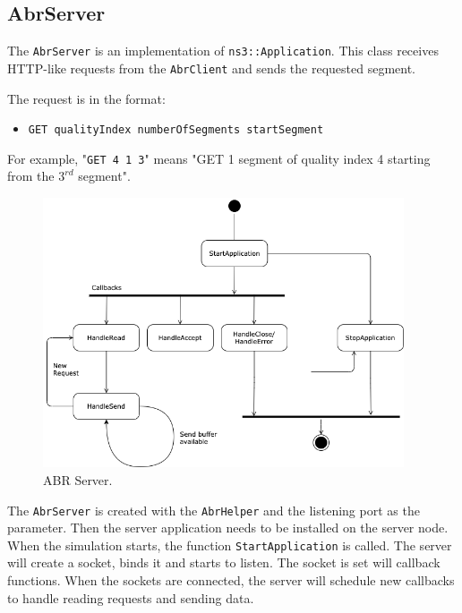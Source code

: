 \subsection{AbrServer}

The \texttt{AbrServer} is an implementation of \texttt{ns3::Application}. This class 
receives HTTP-like requests from the \texttt{AbrClient} and sends the requested segment.

The request is in the format:

\begin{itemize}[noitemsep, topsep=0pt]
  \centering
  \item[] \texttt{GET qualityIndex numberOfSegments startSegment}
\end{itemize}

For example, "\texttt{GET 4 1 3}" means "GET 1 segment of quality index 4 starting from the 
${3^{rd}}$ segment".


\begin{figure}[h]
  \centering
  \includegraphics[width=0.95\textwidth]{img/abrserver.png}
  \caption{ABR Server.}
  \label{fig:abrserver}
\end{figure}


The \texttt{AbrServer} is created with the \texttt{AbrHelper} and the listening port as the 
parameter. Then the
server application needs to be installed on the server node. When the simulation starts, the 
function \texttt{StartApplication} is called. The server will create a socket, binds it and starts
to listen.
The socket is set will callback functions. When the sockets are connected, the server 
will schedule new callbacks to handle reading requests and sending data.


